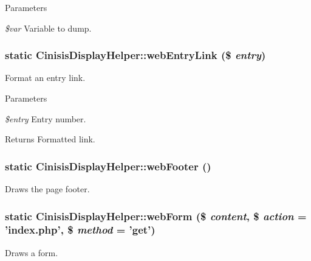 \begin{DoxyParams}{Parameters}
\item[{\em \$var}]Variable to dump. \end{DoxyParams}
\hypertarget{classCinisisDisplayHelper_a7ffe33c336d0b495807a2c4bae78cbfb}{
\subsubsection[{webEntryLink}]{\setlength{\rightskip}{0pt plus 5cm}static CinisisDisplayHelper::webEntryLink (\$ {\em entry})}}
\label{classCinisisDisplayHelper_a7ffe33c336d0b495807a2c4bae78cbfb}
Format an entry link.


\begin{DoxyParams}{Parameters}
\item[{\em \$entry}]Entry number.\end{DoxyParams}
\begin{DoxyReturn}{Returns}
Formatted link. 
\end{DoxyReturn}
\hypertarget{classCinisisDisplayHelper_aa331cd95a86ffd270784736e74f253e6}{
\subsubsection[{webFooter}]{\setlength{\rightskip}{0pt plus 5cm}static CinisisDisplayHelper::webFooter ()}}
\label{classCinisisDisplayHelper_aa331cd95a86ffd270784736e74f253e6}
Draws the page footer. \hypertarget{classCinisisDisplayHelper_a7ba5dd0ddd1ba9de5efdbfa1b62d4efa}{
\subsubsection[{webForm}]{\setlength{\rightskip}{0pt plus 5cm}static CinisisDisplayHelper::webForm (\$ {\em content}, \/  \$ {\em action} = {\ttfamily 'index.php'}, \/  \$ {\em method} = {\ttfamily 'get'})}}
\label{classCinisisDisplayHelper_a7ba5dd0ddd1ba9de5efdbfa1b62d4efa}
Draws a form.


